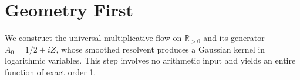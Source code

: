 \section{Geometry First}
We construct the universal multiplicative flow on $\mathbb{R}_{>0}$ and its generator $A_0 = 1/2 + iZ$, whose smoothed resolvent produces a Gaussian kernel in logarithmic variables. This step involves no arithmetic input and yields an entire function of exact order 1.